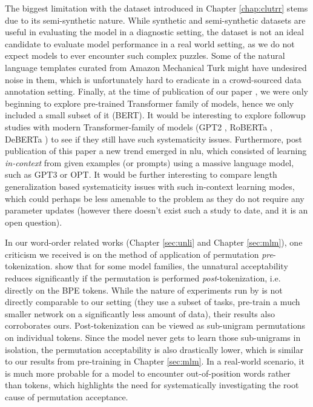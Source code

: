\documentclass[letterpaper, 12pt]{report}
\begin{document}
The biggest limitation with the dataset introduced in Chapter \autoref{chap:clutrr} stems due to its semi-synthetic nature. While synthetic and semi-synthetic datasets are useful in evaluating the model in a diagnostic setting, the dataset is not an ideal candidate to evaluate model performance in a real world setting, as we do not expect models to ever encounter such complex puzzles. Some of the natural language templates curated from Amazon Mechanical Turk might have undesired noise in them, which is unfortunately hard to eradicate in a crowd-sourced data annotation setting. Finally, at the time of publication of our paper \citep{sinha-etal-2019-clutrr}, we were only beginning to explore pre-trained Transformer family of models, hence we only included a small subset of it (BERT). It would be interesting to explore followup studies with modern Transformer-family of models (GPT2 \citep{Radford2019:GPT2}, RoBERTa \citep{Liu2019:RoBERTa}, DeBERTa \citep{he2020deberta}) to see if they still have such systematicity issues. Furthermore, post publication of this paper a new trend emerged in \acrshort{nlu}, which consisted of learning \textit{in-context} from given examples (or prompts) using a massive language model, such as GPT3 or OPT. It would be further interesting to compare length generalization based systematicity issues with such in-context learning modes, which could perhaps be less amenable to the problem as they do not require any parameter updates (however there doesn't exist such a study to date, and it is an open question).

In our word-order related works (Chapter \autoref{sec:unli} and Chapter \autoref{sec:mlm}), one criticism we received is on the method of application of permutation \textit{pre}-tokenization. \cite{ravishankar2022word} show that for some model families, the unnatural acceptability reduces significantly if the permutation is performed \textit{post}-tokenization, i.e. directly on the BPE tokens. While the nature of experiments run by \cite{ravishankar2022word} is not directly comparable to our setting (they use a subset of tasks, pre-train a much smaller network on a significantly less amount of data), their results also corroborates ours. Post-tokenization can be viewed as sub-unigram permutations on individual tokens. Since the model never gets to learn those sub-unigrams in isolation, the permutation acceptability is also drastically lower, which is similar to our results from pre-training in Chapter \autoref{sec:mlm}. In a real-world scenario, it is much more probable for a model to encounter out-of-position words rather than tokens, which highlights the need for systematically investigating the root cause of permutation acceptance.
\end{document}

